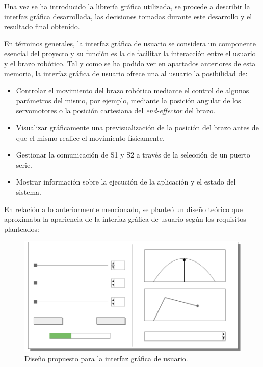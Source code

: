 Una vez se ha introducido la librería gráfica utilizada, se procede a describir la interfaz gráfica desarrollada, las decisiones tomadas durante este desarrollo y el resultado final obtenido.

En términos generales, la interfaz gráfica de usuario se considera un componente esencial del proyecto y su función es la de facilitar la interacción entre el usuario y el brazo robótico. Tal y como se ha podido ver en apartados anteriores de esta memoria, la interfaz gráfica de usuario ofrece una al usuario la posibilidad de:
\begin{itemize}
    \item Controlar el movimiento del brazo robótico mediante el control de algunos parámetros del mismo, por ejemplo, mediante la posición angular de los servomotores o la posición cartesiana del \textit{end-effector} del brazo.
    \item Visualizar gráficamente una previsualización de la posición del brazo antes de que el mismo realice el movimiento físicamente.
    \item Gestionar la comunicación de \ac{S1} y \ac{S2} a través de la selección de un puerto serie.
    \item Mostrar información sobre la ejecución de la aplicación y el estado del sistema.
\end{itemize}

En relación a lo anteriormente mencionado, se planteó un diseño teórico que aproximaba la apariencia de la interfaz gráfica de usuario según los requisitos planteados:

\begin{figure}[H]
    \centering
    \includegraphics[width=0.6\linewidth]{RS/images/InterfaceSketch-MkII.png}
    \caption{Diseño propuesto para la interfaz gráfica de usuario.}
    \label{fig:ui_design}
\end{figure}

